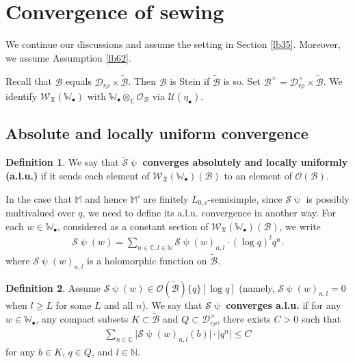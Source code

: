 \documentclass[12pt,a4paper,notitlepage]{article}
\theoremstyle{definition}
\newtheorem{df}{Definition}[section]
\theoremstyle{plain}
\newcommand{\fk}{\mathfrak}
\newcommand{\mc}{\mathcal}
\newcommand{\wtd}{\widetilde}
\newcommand{\scr}{\mathscr}
\newcommand{\blt}{\bullet}
\newcommand{\Wbb}{\mathbb W}
\newcommand{\Mbb}{\mathbb M}
\newcommand{\Cbb}{\mathbb C}
\newcommand{\Nbb}{\mathbb N}
\newcommand{\Lss}{{L_{0,\mathrm{s}}}}
\numberwithin{equation}{section}
\begin{document}
\section{Convergence of sewing}\label{lb52}




We continue our discussions and assume the setting in Section \ref{lb35}. Moreover, we assume Assumption \ref{lb62}.

Recall that $\mc B$ equals $\mc D_{r\rho}\times\wtd{\mc B}$. Then $\mc B$ is Stein if  $\wtd{\mc B}$ is so. Set $\mc B^\times=\mc D_{r\rho}^\times\times\wtd{\mc B}$. \index{B@$\mc B^\times$} We identify $\scr W_{\fk X}(\Wbb_\blt)$ with $\Wbb_\blt\otimes_\Cbb\scr O_{\mc B}$ via $\mc U(\eta_\blt)$.



\subsection*{Absolute and locally uniform convergence}



\begin{df}
We say that $\wtd{\mc S}\uppsi$  \textbf{converges absolutely and locally uniformly (a.l.u.)} if it sends each element of $\scr W_{\fk X}(\Wbb_\blt)(\mc B)$ to an element of $\scr O(\mc B)$. 
\end{df}







In the case that $\Mbb$ and hence $\Mbb'$ are finitely $\Lss$-semisimple, since $\mc S\uppsi$ is possibly multivalued over $q$, we need to define its a.l.u. convergence in another way. For each $w\in \Wbb_\blt$, considered as a constant section of $\scr W_{\fk X}(\Wbb_\blt)(\mc B)$, we write
\begin{align*}
\mc S\uppsi(w)=\sum_{n\in \Cbb,l\in\Nbb}\mc S\uppsi(w)_{n,l}\cdot (\log q)^lq^n.
\end{align*}
where  $\mc S\uppsi(w)_{n,l}$ is a holomorphic function on $\wtd{\mc B}$. 


\begin{df}\label{lb37}
Assume $\mc S\uppsi(w)\in\scr O(\wtd{\mc B})\{q\}[\log q]$ (namely, $\mc S\uppsi(w)_{n,l}=0$ when $l\geq L$ for some $L$ and all $n$). We say that $\mc S\uppsi$ \textbf{converges a.l.u.} if  for any $w\in\Wbb_\blt$, any compact subsets $K\subset\wtd{\mc B}$ and $Q\subset\mc D_{r\rho}^\times$,  there exists $C>0$ such that
\begin{align}
	\sum_{n\in\Cbb}\big|\mc S\uppsi(w)_{n,l}(b)\big|\cdot |q^{n}|\leq C
\end{align}
for any $b\in K$, $q\in Q$, and $l\in\Nbb$. 
\end{df} 
\end{document}
